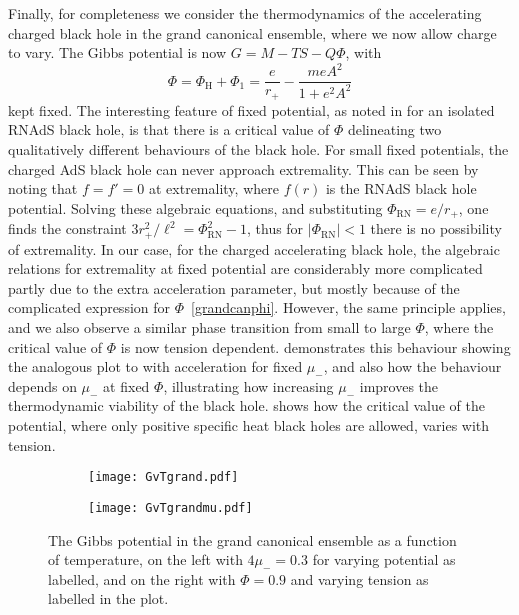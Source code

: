 \documentclass[
twoside,
openright,
frontopenright
]{dmathesis}
\begin{document}
Finally, for completeness we consider the thermodynamics of the accelerating
charged black hole in the grand canonical ensemble, where we now allow charge to
vary. The Gibbs potential is now $G=M-TS-Q\Phi$, with
\begin{equation}
\Phi = \Phi_\mathrm{H} + \Phi_1
= \frac{e}{r_+} - \frac{meA^2}{1+e^2A^2} 
\label{grandcanphi}
\end{equation}
kept fixed. The interesting feature of fixed potential, as noted in
\cite{Chamblin:1999tk} for an isolated RNAdS black hole, is that there is a
critical value of $\Phi$ delineating two qualitatively different behaviours of
the black hole.  For small fixed potentials, the charged AdS black hole can
never approach extremality. This can be seen by noting that $f=f'=0$ at
extremality, where $f(r)$ is the RNAdS black hole potential. Solving these
algebraic equations, and substituting $\Phi_\mathrm{RN} = e/r_+$, one finds the
constraint $3r_+^2 /\ell^2= \Phi_\mathrm{RN}^2-1$, thus for
$|\Phi_\mathrm{RN}|<1$ there is no possibility of extremality. In our case, for
the charged accelerating black hole, the algebraic relations for extremality at
fixed potential are considerably more complicated partly due to the extra
acceleration parameter, but mostly because of the complicated expression for
$\Phi$~\eqref{grandcanphi}. However, the same principle applies, and we also
observe a similar phase transition from small to large $\Phi$, where the
critical value of $\Phi$ is now tension dependent. 
demonstrates this behaviour showing the analogous plot to \cite{Chamblin:1999tk}
with acceleration for fixed $\mu_-$, and also how the behaviour depends on
$\mu_-$ at fixed $\Phi$, illustrating how increasing $\mu_-$ improves the
thermodynamic viability of the black hole.   shows how
the critical value of the potential, where only positive specific heat black
holes are allowed, varies with tension.
\begin{figure}
  \centering
  \begin{subfigure}[b]{0.45\textwidth}
    \texttt{[image: GvTgrand.pdf]}
    \caption{\label{fig:granda}}
  \end{subfigure}\quad
  \begin{subfigure}[b]{0.45\textwidth}
    \texttt{[image: GvTgrandmu.pdf]}
    \caption{\label{fig:grandb}}
  \end{subfigure}
  \caption{\label{fig:grand}The Gibbs potential in the grand canonical ensemble
    as a function of temperature, on the left with $4\mu_- = 0.3$ for varying
    potential as labelled, and on the right with $\Phi=0.9$ and varying tension
    as labelled in the plot.}
\end{figure}
\end{document}
